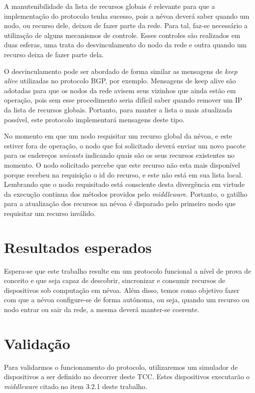 A manutenibilidade da lista de recursos globais é relevante para que a implementação do protocolo tenha sucesso, pois a névoa deverá saber quando um nodo, ou recurso dele, deixou de fazer parte da rede.
Para tal, faz-se necessário a utilização de alguns mecanismos de controle.
Esses controles são realizados em duas esferas, uma trata do desvinculamento do nodo da rede e outra quando um recurso deixa de fazer parte dela.

O desvinculamento pode ser abordado de forma similar as mensagens de \textit{keep alive} utilizadas no protocolo BGP, por exemplo.
Mensagens de keep alive são adotadas para que os nodos da rede avisem seus vizinhos que ainda estão em operação, pois sem esse procedimento seria difícil
saber quando remover um IP da lista de recursos globais. Portanto, para manter a lista o mais atualizada possível, este protocolo implementará mensagens deste tipo.

No momento em que um nodo requisitar um recurso global da névoa, e este estiver fora de operação, o nodo que foi solicitado deverá enviar um novo pacote para os endereços \textit{unicasts} indicando quais são os seus recursos existentes no momento.
O nodo solicitado percebe que este recurso não esta mais disponível porque recebeu na requisição o id do recurso, e este não está em sua lista local.
Lembrando que o nodo requisitado está consciente desta divergência em virtude da execução continua dos métodos providos pelo \textit{middleware}. Portanto, o gatilho para a atualização dos recursos na névoa
é disparado pelo primeiro nodo que requisitar um recurso inválido.


\section{Resultados esperados}

Espera-se que este trabalho resulte em um protocolo funcional a nível de prova de conceito e que seja capaz de descobrir, sincronizar e consumir recursos de dispositivos sob computação em névoa.
Além disso, temos como objetivo fazer com que a névoa configure-se de forma autônoma, ou seja, quando um recurso ou nodo entrar ou sair da rede, a mesma deverá manter-se coerente.


\section{Validação}

Para validarmos o funcionamento do protocolo, utilizaremos um simulador de dispositivos a ser definido no decorrer deste TCC.
Estes dispositivos executarão o \textit{middleware} citado no item 3.2.1 deste trabalho.

